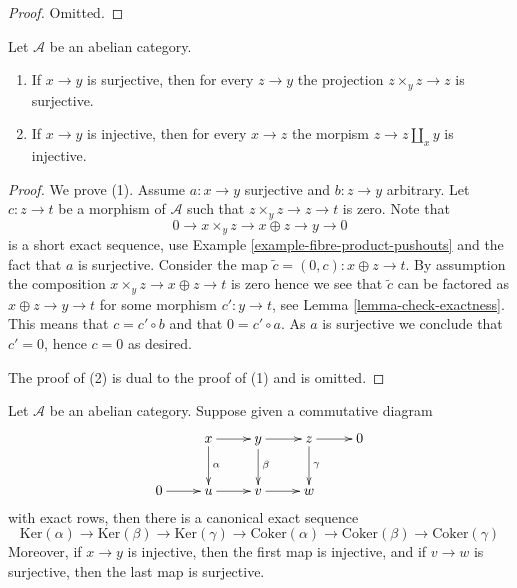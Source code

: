 \begin{proof}
Omitted.
\end{proof}

\begin{lemma}
\label{lemma-epimorphism-universal-abelian-category}
Let $\mathcal{A}$ be an abelian category.
\begin{enumerate}
\item If $x \to y$ is surjective, then for every $z \to y$ the
projection $z \times_y z \to z$ is surjective.
\item If $x \to y$ is injective, then for every $x \to z$ the
morpism $z \to z \amalg_x y$ is injective.
\end{enumerate}
\end{lemma}

\begin{proof}
We prove (1). Assume $a : x \to y$ surjective and $b : z \to y$ arbitrary.
Let $c : z \to t$ be a morphism of $\mathcal{A}$ such that
$z \times_y z \to z \to t$ is zero. Note that
$$
0 \to x \times_y z \to x \oplus z \to y \to 0
$$
is a short exact sequence, use
Example \ref{example-fibre-product-pushouts}
and the fact that $a$ is surjective.
Consider the map $\tilde c = (0, c) : x \oplus z \to t$.
By assumption the composition
$x \times_y z \to x \oplus z \to t$ is zero hence we
see that $\tilde c$ can be factored as
$x \oplus z \to y \to t$ for some morphism $c' : y \to t$, see
Lemma \ref{lemma-check-exactness}.
This means that $c = c' \circ b$ and that $0 = c' \circ a$.
As $a$ is surjective we conclude that $c' = 0$, hence $c = 0$ as desired.

\medskip\noindent
The proof of (2) is dual to the proof of (1) and is omitted.
\end{proof}

\begin{lemma}
\label{lemma-snake}
Let $\mathcal{A}$ be an abelian category.
Suppose given a commutative diagram
$$
\xymatrix{
& x \ar[r] \ar[d]^\alpha &
y \ar[r] \ar[d]^\beta &
z \ar[r] \ar[d]^\gamma &
0 \\
0 \ar[r] & u \ar[r] & v \ar[r] & w
}
$$
with exact rows, then there is a canonical exact sequence
$$
\text{Ker}(\alpha) \to \text{Ker}(\beta) \to \text{Ker}(\gamma)
\to
\text{Coker}(\alpha) \to \text{Coker}(\beta) \to \text{Coker}(\gamma)
$$
Moreover, if $x \to y$ is injective, then the first map is
injective, and if $v \to w$ is surjective, then the last
map is surjective.
\end{lemma}

